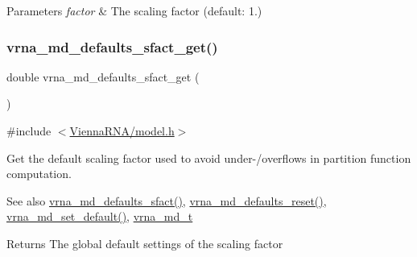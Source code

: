 \begin{DoxyParams}{Parameters}
{\em factor} & The scaling factor (default\+: 1.) \\
\hline
\end{DoxyParams}
\mbox{\label{group__model__details_gab2df6aab954b63fd3592d18e90285dae}} 
\subsubsection{\texorpdfstring{vrna\+\_\+md\+\_\+defaults\+\_\+sfact\+\_\+get()}{vrna\_md\_defaults\_sfact\_get()}}
{\footnotesize\ttfamily double vrna\+\_\+md\+\_\+defaults\+\_\+sfact\+\_\+get (\begin{DoxyParamCaption}\item[{void}]{ }\end{DoxyParamCaption})}



{\ttfamily \#include $<$\mbox{\hyperlink{model_8h}{Vienna\+R\+N\+A/model.\+h}}$>$}



Get the default scaling factor used to avoid under-\//overflows in partition function computation. 

\begin{DoxySeeAlso}{See also}
\mbox{\hyperlink{group__model__details_ga3f73d3029d3d0025d4cc311510cd95a3}{vrna\+\_\+md\+\_\+defaults\+\_\+sfact()}}, \mbox{\hyperlink{group__model__details_ga70834424cf804d149937de89f80ceb45}{vrna\+\_\+md\+\_\+defaults\+\_\+reset()}}, \mbox{\hyperlink{group__model__details_ga8ac6ff84936282436f822644bf841f66}{vrna\+\_\+md\+\_\+set\+\_\+default()}}, \mbox{\hyperlink{group__model__details_ga1f8a10e12a0a1915f2a4eff0b28ea17c}{vrna\+\_\+md\+\_\+t}} 
\end{DoxySeeAlso}
\begin{DoxyReturn}{Returns}
The global default settings of the scaling factor 
\end{DoxyReturn}
\mbox{\label{group__model__details_gabad896c3650d420f3f3ddefc69e2bceb}} 
